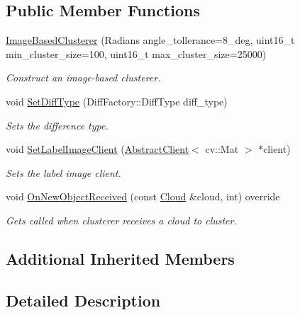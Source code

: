 \subsection*{Public Member Functions}
\begin{DoxyCompactItemize}
\item 
\hyperlink{classdepth__clustering_1_1ImageBasedClusterer_a6a8bdd77542e14ee420988ad80579f35}{Image\+Based\+Clusterer} (Radians angle\+\_\+tollerance=8\+\_\+deg, uint16\+\_\+t min\+\_\+cluster\+\_\+size=100, uint16\+\_\+t max\+\_\+cluster\+\_\+size=25000)
\begin{DoxyCompactList}\small\item\em Construct an image-\/based clusterer. \end{DoxyCompactList}\item 
void \hyperlink{classdepth__clustering_1_1ImageBasedClusterer_a0dd114829041816d309d6c8f9ff41cad}{Set\+Diff\+Type} (Diff\+Factory\+::\+Diff\+Type diff\+\_\+type)
\begin{DoxyCompactList}\small\item\em Sets the difference type. \end{DoxyCompactList}\item 
void \hyperlink{classdepth__clustering_1_1ImageBasedClusterer_a6af0de0dad7450c34c655fb447886716}{Set\+Label\+Image\+Client} (\hyperlink{classdepth__clustering_1_1AbstractClient}{Abstract\+Client}$<$ cv\+::\+Mat $>$ $\ast$client)
\begin{DoxyCompactList}\small\item\em Sets the label image client. \end{DoxyCompactList}\item 
void \hyperlink{classdepth__clustering_1_1ImageBasedClusterer_a98e7be00573047a2380ded00bb0542e6}{On\+New\+Object\+Received} (const \hyperlink{classdepth__clustering_1_1Cloud}{Cloud} \&cloud, int) override
\begin{DoxyCompactList}\small\item\em Gets called when clusterer receives a cloud to cluster. \end{DoxyCompactList}\end{DoxyCompactItemize}
\subsection*{Additional Inherited Members}


\subsection{Detailed Description}
